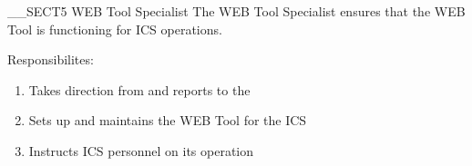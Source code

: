 __SECT5{ WEB Tool Specialist
\label{sec:WEBToolSpecialist} }
The WEB Tool Specialist ensures that the WEB Tool 
is functioning for ICS operations.

Responsibilites:
\begin{enumerate}
\item Takes direction from and reports to the \CommunicationsManager 
\item Sets up and maintains the WEB Tool for the ICS 
\item Instructs ICS personnel on its operation
\end{enumerate}

